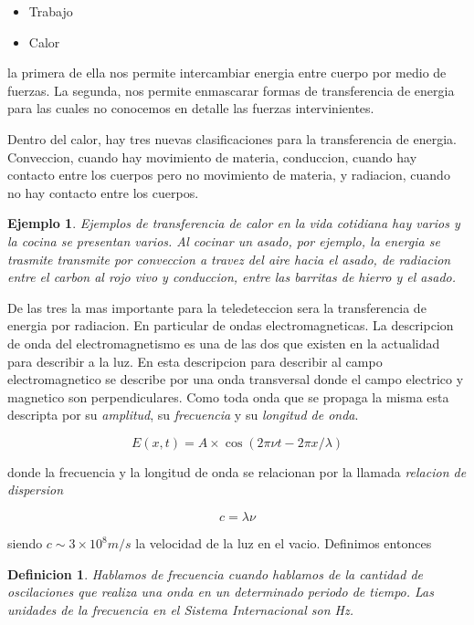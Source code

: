 \documentclass[a4paper,12pt]{article}
\newtheorem{dex}{Definicion}[section]
\newtheorem{exa}{Ejemplo}[section]
\begin{document}
\begin{itemize}
  \item Trabajo
  \item Calor
\end{itemize}

la primera de ella nos permite intercambiar energia entre cuerpo por medio de
fuerzas. La segunda, nos permite enmascarar formas de transferencia de energia
para las cuales no conocemos en detalle las fuerzas intervinientes.

Dentro del calor, hay tres nuevas clasificaciones para la transferencia de
energia. Conveccion, cuando hay movimiento de materia, conduccion, cuando hay
contacto entre los cuerpos pero no movimiento de materia, y radiacion, cuando no
hay contacto entre los cuerpos.

\begin{exa}
  Ejemplos de transferencia de calor en la vida cotidiana hay varios y la cocina
  se presentan varios. Al cocinar un asado, por ejemplo, la energia se trasmite
  transmite por conveccion a travez del aire hacia el asado, de radiacion entre
  el carbon al rojo vivo y conduccion, entre las barritas de hierro y el asado.
\end{exa}

De las tres la mas importante para la teledeteccion sera la transferencia de
energia por radiacion. En particular de ondas electromagneticas. La descripcion
de onda del electromagnetismo es una de las dos que existen en la actualidad
para describir a la luz. En esta descripcion para describir al campo
electromagnetico se describe por una onda transversal donde el campo electrico y
magnetico son perpendiculares. Como toda onda que se propaga la misma esta
descripta por su \emph{amplitud}, su \emph{frecuencia} y su \emph{longitud de
onda}.

\begin{equation}
  E(x,t) = A \times \cos(2\pi \nu t - 2\pi x / \lambda)
\end{equation}

donde la frecuencia y la longitud de onda se relacionan por la llamada
\emph{relacion de dispersion}

\begin{equation}
  c = \lambda \nu
\end{equation}

siendo $c\sim 3\times 10^8 m/s$ la velocidad de la luz en el vacio. Definimos
entonces 

\begin{dex}
  Hablamos de frecuencia cuando hablamos de la cantidad de oscilaciones que
  realiza una onda en un determinado periodo de tiempo. Las unidades de la
  frecuencia en el Sistema Internacional son Hz.
\end{dex}
\end{document}
